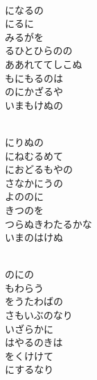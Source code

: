 \documentclass[10pt,b5j]{tarticle} %
\begin{document}
\begin{enumerate}
\begin{minipage}[c]{\blocksize}
        \vspace{\linespace}
        \item~\\
        になるの\\
        にるに\\
        みるがを\\
        るひとひらのの\\
        ああれててしこぬ\\
        もにもるのは\\
        のにかざるや\\
        いまもけぬの
        
        \vspace{\linespace}
        \item~\\
        にりぬの\\
        にねむるめて\\
        におどるもやの\\
        さなかにうの\\
        よののに\\
        きつのを\\
        つらぬきわたるかな\\
        いまのはけぬ
        
        \vspace{\linespace}
        \item~\\
        のにの\\
        もわらう\\
        をうたわばの\\
        さもいぶのなり\\
        いざらかに\\
        はやるのきは\\
        をくけけて\\
        にするなり
    
    \end{minipage}
\end{enumerate} %
\end{document}
